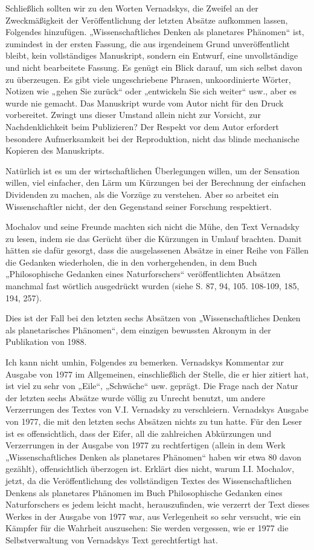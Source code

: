 \documentclass[11pt,a4paper]{article}
\begin{document}
Schließlich sollten wir zu den Worten Vernadskys, die Zweifel an der
Zweckmäßigkeit der Veröffentlichung der letzten Absätze aufkommen lassen,
Folgendes hinzufügen. „Wissenschaftliches Denken als planetares Phänomen“ ist,
zumindest in der ersten Fassung, die aus irgendeinem Grund unveröffentlicht
bleibt, kein vollständiges Manuskript, sondern ein Entwurf, eine
unvollständige und nicht bearbeitete Fassung. Es genügt ein Blick darauf, um
sich selbst davon zu überzeugen. Es gibt viele ungeschriebene Phrasen,
unkoordinierte Wörter, Notizen wie „gehen Sie zurück“ oder „entwickeln Sie
sich weiter“ usw., aber es wurde nie gemacht. Das Manuskript wurde vom Autor
nicht für den Druck vorbereitet. Zwingt uns dieser Umstand allein nicht zur
Vorsicht, zur Nachdenklichkeit beim Publizieren? Der Respekt vor dem Autor
erfordert besondere Aufmerksamkeit bei der Reproduktion, nicht das blinde
mechanische Kopieren des Manuskripts.

Natürlich ist es um der wirtschaftlichen Überlegungen willen, um der Sensation
willen, viel einfacher, den Lärm um Kürzungen bei der Berechnung der einfachen
Dividenden zu machen, als die Vorzüge zu verstehen. Aber so arbeitet ein
Wissenschaftler nicht, der den Gegenstand seiner Forschung respektiert.

Mochalov und seine Freunde machten sich nicht die Mühe, den Text Vernadsky zu
lesen, indem sie das Gerücht über die Kürzungen in Umlauf brachten. Damit
hätten sie dafür gesorgt, dass die ausgelassenen Absätze in einer Reihe von
Fällen die Gedanken wiederholen, die in den vorhergehenden, in dem Buch
„Philosophische Gedanken eines Naturforschers“ veröffentlichten Absätzen
manchmal fast wörtlich ausgedrückt wurden (siehe S. 87, 94, 105. 108-109,
185, 194, 257).

Dies ist der Fall bei den letzten sechs Absätzen von „Wissenschaftliches
Denken als planetarisches Phänomen“, dem einzigen bewussten Akronym in der
Publikation von 1988.

Ich kann nicht umhin, Folgendes zu bemerken. Vernadskys Kommentar zur Ausgabe
von 1977 im Allgemeinen, einschließlich der Stelle, die er hier zitiert hat,
ist viel zu sehr von „Eile“, „Schwäche“ usw. geprägt. Die Frage nach der Natur
der letzten sechs Absätze wurde völlig zu Unrecht benutzt, um andere
Verzerrungen des Textes von V.I. Vernadsky zu verschleiern. Vernadskys Ausgabe
von 1977, die mit den letzten sechs Absätzen nichts zu tun hatte. Für den
Leser ist es offensichtlich, dass der Eifer, all die zahlreichen Abkürzungen
und Verzerrungen in der Ausgabe von 1977 zu rechtfertigen (allein in dem Werk
„Wissenschaftliches Denken als planetares Phänomen“ haben wir etwa 80 davon
gezählt), offensichtlich überzogen ist. Erklärt dies nicht, warum
I.I. Mochalov, jetzt, da die Veröffentlichung des vollständigen Textes des
Wissenschaftlichen Denkens als planetares Phänomen im Buch Philosophische
Gedanken eines Naturforschers es jedem leicht macht, herauszufinden, wie
verzerrt der Text dieses Werkes in der Ausgabe von 1977 war, aus Verlegenheit
so sehr versucht, wie ein Kämpfer für die Wahrheit auszusehen: Sie werden
vergessen, wie er 1977 die Selbstverwaltung von Vernadskys Text gerechtfertigt
hat.
\end{document}
